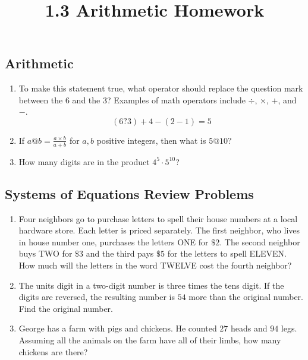 \documentclass{article}
\title{1.3 Arithmetic Homework}
\author{}
\date{}
\begin{document}
\maketitle

\subsection*{Arithmetic}
\begin{enumerate}
    \item To make this statement true, what operator should replace the question mark between the $6$ and the $3$?
    Examples of math operators include $\div$, $\times$, $+$, and $-$.
    \[(6?3) + 4 - (2 - 1) = 5\] 
    \vspace{3cm}
    \item If $a@b = \frac{a \times b}{a + b}$ for $a, b$ positive integers, then what is $5@10$?
    \vspace{3cm}
    \item How many digits are in the product $4^{5} \cdot 5^{10}$?
    \vspace{3cm} 
\end{enumerate}

\subsection*{Systems of Equations Review Problems}
\begin{enumerate}[resume]
    \item Four neighbors go to purchase letters to spell their house numbers at a local hardware store.
    Each letter is priced separately.
    The first neighbor, who lives in house number one, purchases the letters ONE for $\$2$.
    The second neighbor buys TWO for $\$3$ and the third pays $\$5$ for the letters to spell ELEVEN.
    How much will the letters in the word TWELVE cost the fourth neighbor?
    \vspace{3cm}
    \item The units digit in a two-digit number is three times the tens digit.
    If the digits are reversed, the resulting number is $54$ more than the original number.
    Find the original number.
    \vspace{3cm}
    \item George has a farm with pigs and chickens.
    He counted $27$ heads and $94$ legs.
    Assuming all the animals on the farm have all of their limbs, how many chickens are there?
    \vspace{3cm}
\end{enumerate}
\end{document}
